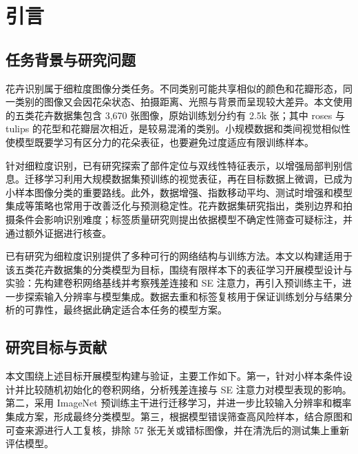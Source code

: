 \documentclass[11pt,a4paper,UTF8,fontset=windows]{ctexart}
\begin{document}
\vspace{0.6em}

\section{引言}

\subsection{任务背景与研究问题}

花卉识别属于细粒度图像分类任务。不同类别可能共享相似的颜色和花瓣形态，同一类别的图像又会因花朵状态、拍摄距离、光照与背景而呈现较大差异。本文使用的五类花卉数据集包含 3{,}670 张图像，原始训练划分约有 2.5k 张；其中 roses 与 tulips 的花型和花瓣层次相近，是较易混淆的类别。小规模数据和类间视觉相似性使模型既要学习有区分力的花朵表征，也要避免过度适应有限训练样本。

针对细粒度识别，已有研究探索了部件定位与双线性特征表示，以增强局部判别信息\cite{lin2015bilinear,wei2022fgia}。迁移学习利用大规模数据集预训练的视觉表征，再在目标数据上微调，已成为小样本图像分类的重要路线\cite{he2016resnet,liu2022convnext,tan2021effnetv2}。此外，数据增强、指数移动平均、测试时增强和模型集成等策略也常用于改善泛化与预测稳定性\cite{zhang2018mixup,szegedy2016inception,tarvainen2017mean,dietterich2000ensemble}。花卉数据集研究指出，类别边界和拍摄条件会影响识别难度\cite{nilsback2008flower}；标签质量研究则提出依据模型不确定性筛查可疑标注，并通过额外证据进行核查\cite{northcutt2021confident}。

已有研究为细粒度识别提供了多种可行的网络结构与训练方法。本文以构建适用于该五类花卉数据集的分类模型为目标，围绕有限样本下的表征学习开展模型设计与实验：先构建卷积网络基线并考察残差连接和 SE 注意力，再引入预训练主干，进一步探索输入分辨率与模型集成。数据去重和标签复核用于保证训练划分与结果分析的可靠性，最终据此确定适合本任务的模型方案。

\subsection{研究目标与贡献}

本文围绕上述目标开展模型构建与验证，主要工作如下。第一，针对小样本条件设计并比较随机初始化的卷积网络，分析残差连接与 SE 注意力对模型表现的影响。第二，采用 ImageNet 预训练主干进行迁移学习，并进一步比较输入分辨率和概率集成方案，形成最终分类模型。第三，根据模型错误筛查高风险样本，结合原图和可查来源进行人工复核，排除 57 张无关或错标图像，并在清洗后的测试集上重新评估模型。
\end{document}
